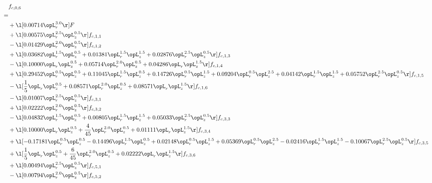 \begin{alignat}{2} 
\label{eq:f_06_1} 
& f_{c,0,6} \nonumber \\ 
 = \\ 
& + \l[  0.00714 \opL_r^{3.0}  \r] F \nonumber \\ 
& + \l[  0.00575 \opL_r^{2.5} \opL_z^{0.5}  \r] f_{c,1,1} \nonumber \\ 
& - \l[  0.01429 \opL_r^{2.0} \opL_z^{0.5}  \r] f_{c,1,2} \nonumber \\ 
& + \l[  0.03682 \opL_r^{1.5} \opL_z^{0.5} +  0.01381 \opL_r^{1.5} \opL_z^{1.5} +  0.02876 \opL_r^{2.5} \opL_z^{0.5}  \r] f_{c,1,3} \nonumber \\ 
& - \l[  0.10000 \opL_r \opL_z^{0.5} +  0.05714 \opL_r^{2.0} \opL_z^{0.5} +  0.04286 \opL_r \opL_z^{1.5}  \r] f_{c,1,4} \nonumber \\ 
& + \l[  0.29452 \opL_r^{0.5} \opL_z^{0.5} +  0.11045 \opL_r^{1.5} \opL_z^{0.5} +  0.14726 \opL_r^{0.5} \opL_z^{1.5} +  0.09204 \opL_r^{0.5} \opL_z^{2.5} +  0.04142 \opL_r^{1.5} \opL_z^{1.5} +  0.05752 \opL_r^{2.5} \opL_z^{0.5}  \r] f_{c,1,5} \nonumber \\ 
& - \l[ \frac{1}{5} \opL_r \opL_z^{0.5} +  0.08571 \opL_r^{2.0} \opL_z^{0.5} +  0.08571 \opL_r \opL_z^{1.5}  \r] f_{c,1,6} \nonumber \\ 
& - \l[  0.01007 \opL_r^{2.5} \opL_z^{0.5}  \r] f_{c,3,1} \nonumber \\ 
& + \l[  0.02222 \opL_r^{2.0} \opL_z^{0.5}  \r] f_{c,3,2} \nonumber \\ 
& - \l[  0.04832 \opL_r^{1.5} \opL_z^{0.5} +  0.00805 \opL_r^{1.5} \opL_z^{1.5} +  0.05033 \opL_r^{2.5} \opL_z^{0.5}  \r] f_{c,3,3} \nonumber \\ 
& + \l[  0.10000 \opL_r \opL_z^{0.5} + \frac{4}{45} \opL_r^{2.0} \opL_z^{0.5} +  0.01111 \opL_r \opL_z^{1.5}  \r] f_{c,3,4} \nonumber \\ 
& + \l[  -0.17181 \opL_r^{0.5} \opL_z^{0.5}   -0.14496 \opL_r^{1.5} \opL_z^{0.5} +  0.02148 \opL_r^{0.5} \opL_z^{1.5} +  0.05369 \opL_r^{0.5} \opL_z^{2.5}   -0.02416 \opL_r^{1.5} \opL_z^{1.5}   -0.10067 \opL_r^{2.5} \opL_z^{0.5}  \r] f_{c,3,5} \nonumber \\ 
& + \l[ \frac{1}{5} \opL_r \opL_z^{0.5} + \frac{6}{45} \opL_r^{2.0} \opL_z^{0.5} +  0.02222 \opL_r \opL_z^{1.5}  \r] f_{c,3,6} \nonumber \\ 
& + \l[  0.00494 \opL_r^{2.5} \opL_z^{0.5}  \r] f_{c,5,1} \nonumber \\ 
& - \l[  0.00794 \opL_r^{2.0} \opL_z^{0.5}  \r] f_{c,5,2} \nonumber \\ 

\end{alignat}
